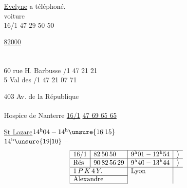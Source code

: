 \uline{Evelyne} a téléphoné.\\
 voiture\\
16/1 47 29 50 50

\uline{82000}\\
\\
\\
60 rue H. Barbusse /1 47 21  21\\
5 Val des  /1 47 21 07 71

403 Av. de la République\\
\\
Hospice de Nanterre \quad \uline{16/1} \uline{47 69 65 65}

\uline{St Lazare}\quad $14^{\rm h}04-14^{\rm h}\unsure{16|15}$\\
$14^{\rm h}\unsure{19|10}$ --\\
\[
\begin{array}{|l|l|l|l}
\hline
16/1&82\,50\,50&9^{\rm h}01-12^{\rm h}54&\big)\\
\hline
\text{Rés}&90\,82\,56\,29&9^{\rm h}40-13^{\rm h}44&\big)\\
\hline
\multicolumn{2}{|l|}{1\,P\,K\,4\,Y.}&\text{Lyon}\\
\cline{1-2}
\multicolumn{2}{|l|}{\text{Alexandre}}&\\
\cline{1-2}
\end{array}
\]
